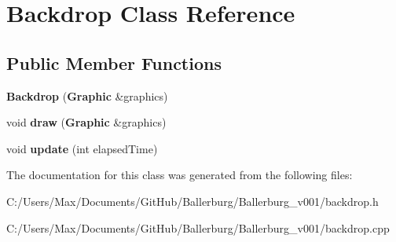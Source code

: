 \section{Backdrop Class Reference}
\label{class_backdrop}
\subsection*{Public Member Functions}
\begin{DoxyCompactItemize}
\item 
{\bfseries Backdrop} ({\bf Graphic} \&graphics)\label{class_backdrop_aff823aed9971b23163805ec4e95fc416}

\item 
void {\bfseries draw} ({\bf Graphic} \&graphics)\label{class_backdrop_a29da942a98d4e2abef1eb319d3e91eb5}

\item 
void {\bfseries update} (int elapsed\+Time)\label{class_backdrop_a884306a0b99b02aedcc8ece6d816c316}

\end{DoxyCompactItemize}


The documentation for this class was generated from the following files\+:\begin{DoxyCompactItemize}
\item 
C\+:/\+Users/\+Max/\+Documents/\+Git\+Hub/\+Ballerburg/\+Ballerburg\+\_\+v001/backdrop.\+h\item 
C\+:/\+Users/\+Max/\+Documents/\+Git\+Hub/\+Ballerburg/\+Ballerburg\+\_\+v001/backdrop.\+cpp\end{DoxyCompactItemize}
